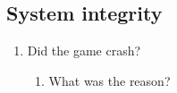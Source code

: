 \subsection{System integrity}
\begin{enumerate}

\item Did the game crash?

\begin{enumerate}
    \item What was the reason?
\end{enumerate}

\end{enumerate}
